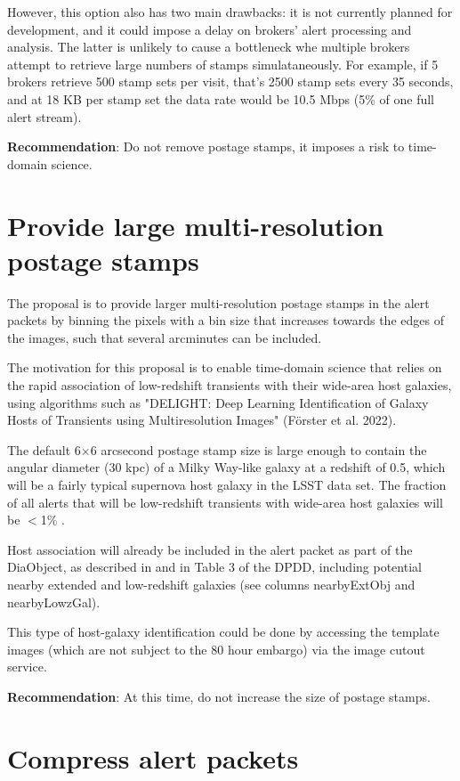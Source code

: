 \documentclass[DM,authoryear,toc]{lsstdoc}
\begin{document}
However, this option also has two main drawbacks: it is not currently planned for development, and it could impose a delay on brokers' alert processing and analysis.
The latter is unlikely to cause a bottleneck whe multiple brokers attempt to retrieve large numbers of stamps simulataneously.
For example, if 5 brokers retrieve 500 stamp sets per visit, that's 2500 stamp sets every 35 seconds, and at 18 KB per stamp set the data rate would be 10.5 Mbps (5\% of one full alert stream).

\textbf{Recommendation}: Do not remove postage stamps, it imposes a risk to time-domain science.


\section{Provide large multi-resolution postage stamps}\label{sec:bigstamps}

The proposal is to provide larger multi-resolution postage stamps in the alert packets by binning the pixels with a bin size that increases towards the edges of the images, such that several arcminutes can be included.

The motivation for this proposal is to enable time-domain science that relies on the rapid association of low-redshift transients with their wide-area host galaxies, using algorithms such as "DELIGHT: Deep Learning Identification of Galaxy Hosts of Transients using Multiresolution Images" (Förster et al. 2022).

The default 6$\times$6 arcsecond postage stamp size is large enough to contain the angular diameter (30 kpc) of a Milky Way-like galaxy at a redshift of 0.5, which will be a fairly typical supernova host galaxy in the LSST data set.
The fraction of all alerts that will be low-redshift transients with wide-area host galaxies will be $<$1\% .

Host association will already be included in the alert packet as part of the DiaObject, as described in  and in Table 3 of the DPDD, including potential nearby extended and low-redshift galaxies (see columns nearbyExtObj and nearbyLowzGal).

This type of host-galaxy identification could be done by accessing the template images (which are not subject to the 80 hour embargo) via the image cutout service.

\textbf{Recommendation}: At this time, do not increase the size of postage stamps.


\section{Compress alert packets}\label{sec:compression}
\end{document}
